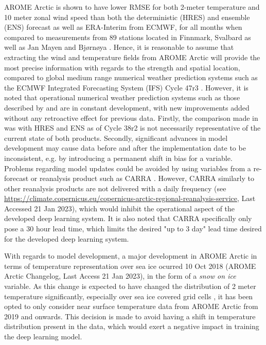 \documentclass[../main/thesis.tex]{subfiles}
\begin{document}
AROME Arctic is shown to have lower RMSE for both 2-meter temperature and 10 meter zonal wind speed than both the deterministic (HRES) and ensemble (ENS) forecast as well as ERA-Interim from ECMWF, for all months when compared to measurements from 89 stations located in Finnmark, Svalbard as well as Jan Mayen and Bjørnøya \citep{Mueller2017}. Hence, it is reasonable to assume that extracting the wind and temperature fields from AROME Arctic will provide the most precise information with regards to the strength and spatial location, compared to global medium range numerical weather prediction systems such as the ECMWF Integrated Forecasting System (IFS) Cycle 47r3 \citep{Haiden2022}. However, it is noted that operational numerical weather prediction systems such as those described by \citet{Mueller2017} and \citet{Haiden2022} are in constant development, with new improvements added without any retroactive effect for previous data. Firstly, the comparison made in \citet{Mueller2017} was with HRES and ENS as of Cycle 38r2 \cite{Bauer2013} is not necessarily representative of the current state of both products. Secondly, significant advances in model development may cause data before and after the implementation date to be inconsistent, e.g. by introducing a permanent shift in bias for a variable. Problems regarding model updates could be avoided by using variables from a re-forecast or reanalysis product such as CARRA \citep{Koeltzow2022}. However, CARRA similarly to other reanalysis products are not delivered with a daily frequency (see \url{https://climate.copernicus.eu/copernicus-arctic-regional-reanalysis-service}, Last Accessed 21 Jan 2023), which would inhibit the operational aspect of the developed deep learning system. It is also noted that CARRA specifically only pose a 30 hour lead time, which limits the desired "up to 3 day" lead time desired for the developed deep learning system.

With regards to model development, a major development in AROME Arctic in terms of temperature representation over sea ice ocurred 10 Oct 2018 (AROME Arctic Changelog, Last Access 21 Jan 2023), in the form of a \textit{snow on ice} variable. As this change is expected to have changed the distribution of 2 meter temperature significantly, especially over sea ice covered grid cells \citep{Batrak2018,Batrak2019}, it has been opted to only consider near surface temperature data from AROME Arctic from 2019 and onwards. This decision is made to avoid having a shift in temperature distribution present in the data, which would exert a negative impact in training the deep learning model.
\end{document}
